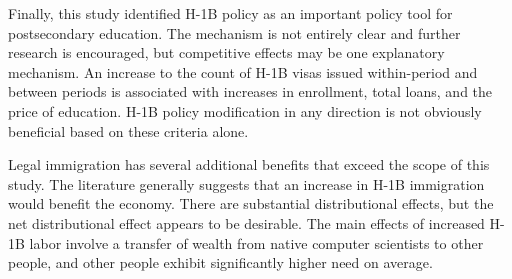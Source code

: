 \documentclass[review]{elsarticle}
\begin{document}


Finally, this study identified H-1B policy as an important policy tool for postsecondary education.
The mechanism is not entirely clear and further research is encouraged,
but competitive effects may be one explanatory mechanism.
An increase to the count of H-1B visas issued within-period and between periods is associated with increases in enrollment, total loans, and the price of education.
H-1B policy modification in any direction is not obviously beneficial based on these criteria alone.

Legal immigration has several additional benefits that exceed the scope of this study.
The literature generally suggests that an increase in H-1B immigration would benefit the economy\cite{bound2017understanding}.
There are substantial distributional effects, but the net distributional effect appears to be desirable.
The main effects of increased H-1B labor involve a transfer of wealth from native computer scientists to other people,
and other people exhibit significantly higher need on average.
\end{document}
